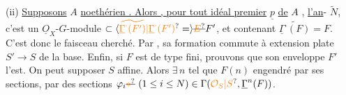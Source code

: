 (ii) \uline{Supposons} $A$ \uline{noethérien . Alors , pour tout idéal premier} $\underline p$ \uline{de} $A$ , \uline{l'an}-
$\widetilde N$, c'est un $\underline O_X$-$G$-module 
$\subset\inserted{\unsure{\widetilde{\underline{\Gamma}^{\cdot}(F')}|\underline{\Gamma}^{\cdot}(F')}=}\deleted{\unsure{E}}F'$, et contenant $\widetilde{\underline{\Gamma}^{\cdot}(F)}=F$. C'est donc le
 faisceau cherché. Par ,
sa formation commute à  extension
plate $S'\to S$ de la base. Enfin, si
$F$ est de type fini,  prouvons que
son enveloppe $F'$ l'est. On peut supposer $S$
affine. Alors $\exists\,n$ tel que $F(n)$
engendré par ses sections,   par des
sections $\varphi_i\deleted{\unsure{*}}\ (1\leq i\leq N)\in\Gamma(\unsure{\mathcal O_S|S},\underline{\Gamma}^n(F))$.

